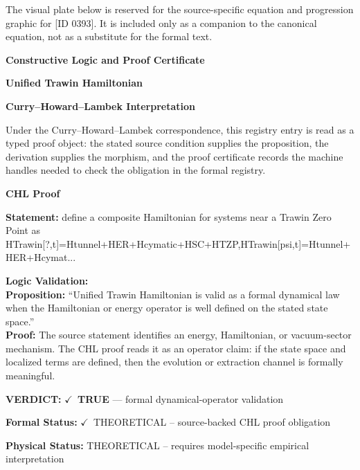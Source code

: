 \begingroup\footnotesize\sloppy
The visual plate below is reserved for the source-specific equation and progression graphic for [ID 0393]. It is included only as a companion to the canonical equation, not as a substitute for the formal text.
\par\endgroup
\ifTZPDarkEdition
{}
\fi

\clearpage
\begingroup\tzpsupportsetup
\noindent\textbf{\fontsize{10.8pt}{12.8pt}\selectfont [ID 0393] Constructive Logic and Proof Certificate}\par
\noindent\textbf{\fontsize{10pt}{12pt}\selectfont Unified Trawin Hamiltonian}\par
\vspace{0.45em}
\begingroup
\footnotesize
\setlength{\parskip}{0.22em}
\setlength{\parindent}{0pt}
\noindent\textbf{Curry--Howard--Lambek Interpretation}\par
Under the Curry--Howard--Lambek correspondence, this registry entry is read as a typed proof
object: the stated source condition supplies the proposition, the derivation supplies the
morphism, and the proof certificate records the machine handles needed to check the obligation
in the formal registry.

\vspace{0.45em}
\noindent\textbf{CHL Proof}\par
\textbf{Statement:} define a composite Hamiltonian for systems near a Trawin Zero Point as
HTrawin[?,t]=Htunnel+HER+Hcymatic+HSC+HTZP,HTrawin[psi,t]=Htunnel+HER+Hcymat...

\textbf{Logic Validation:}\\
\textbf{Proposition:} ``Unified Trawin Hamiltonian is valid as a formal dynamical law when the Hamiltonian or
energy operator is well defined on the stated state space.''\\
\textbf{Proof:} The source statement identifies an energy, Hamiltonian, or vacuum-sector mechanism. The
CHL proof reads it as an operator claim: if the state space and localized terms are
defined, then the evolution or extraction channel is formally meaningful.

\textbf{VERDICT:} \ensuremath{\checkmark}\ \textbf{TRUE} --- formal dynamical-operator validation

\textbf{Formal Status:} \ensuremath{\checkmark}\ THEORETICAL -- source-backed CHL proof obligation

\textbf{Physical Status:} THEORETICAL -- requires model-specific empirical interpretation
\par\vspace{0.45em}
\par
\ifTZPDarkEdition
{}
\fi
\endgroup
\endgroup
